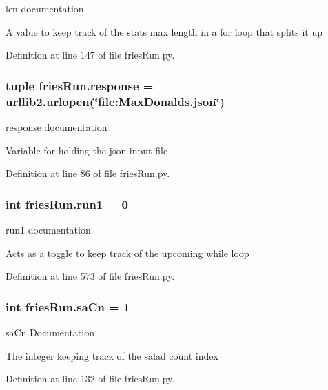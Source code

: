 len documentation 

A value to keep track of the stats max length in a for loop that splits it up 

Definition at line 147 of file fries\-Run.\-py.

\hypertarget{namespacefriesRun_a7f032907b58d9dc74dabf295114f3d28}{
\subsubsection[{response}]{\setlength{\rightskip}{0pt plus 5cm}tuple fries\-Run.\-response = urllib2.\-urlopen(\char`\"{}file\-:\-Max\-Donalds.\-json\char`\"{})}}\label{namespacefriesRun_a7f032907b58d9dc74dabf295114f3d28}


response documentation 

Variable for holding the json input file 

Definition at line 86 of file fries\-Run.\-py.

\hypertarget{namespacefriesRun_af96ea5d509927a7fe5e022fe4ea558d7}{
\subsubsection[{run1}]{\setlength{\rightskip}{0pt plus 5cm}int fries\-Run.\-run1 = 0}}\label{namespacefriesRun_af96ea5d509927a7fe5e022fe4ea558d7}


run1 documentation 

Acts as a toggle to keep track of the upcoming while loop 

Definition at line 573 of file fries\-Run.\-py.

\hypertarget{namespacefriesRun_aeebe19aeab24dc33cda8beda0936ce61}{
\subsubsection[{sa\-Cn}]{\setlength{\rightskip}{0pt plus 5cm}int fries\-Run.\-sa\-Cn = 1}}\label{namespacefriesRun_aeebe19aeab24dc33cda8beda0936ce61}


sa\-Cn Documentation 

The integer keeping track of the salad count index 

Definition at line 132 of file fries\-Run.\-py.

